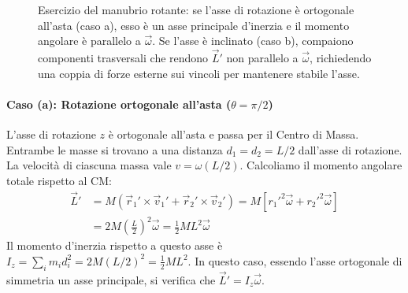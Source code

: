 \begin{figure}[ht]
    \caption{Esercizio del manubrio rotante: se l'asse di rotazione è ortogonale all'asta (caso a), esso è un asse principale d'inerzia e il momento angolare è parallelo a $\vec{\omega}$. Se l'asse è inclinato (caso b), compaiono componenti trasversali che rendono $\vec{L}'$ non parallelo a $\vec{\omega}$, richiedendo una coppia di forze esterne sui vincoli per mantenere stabile l'asse.}
\end{figure}

\paragraph{Caso (a): Rotazione ortogonale all'asta ($\theta = \pi/2$)}
L'asse di rotazione $z$ è ortogonale all'asta e passa per il Centro di Massa. Entrambe le masse si trovano a una distanza $d_1 = d_2 = L/2$ dall'asse di rotazione. La velocità di ciascuna massa vale $v = \omega (L/2)$. Calcoliamo il momento angolare totale rispetto al CM:
\begin{align*}
    \vec{L}' &= M(\vec{r}_1' \times \vec{v}_1' + \vec{r}_2' \times \vec{v}_2') = M \left[ {r_1'}^2 \vec{\omega} + {r_2'}^2 \vec{\omega} \right] \\
    &= 2M \left( \frac{L}{2} \right)^2 \vec{\omega} = \frac{1}{2} M L^2 \vec{\omega}
\end{align*}
Il momento d'inerzia rispetto a questo asse è $I_z = \sum_i m_i d_i^2 = 2M(L/2)^2 = \frac{1}{2}ML^2$. In questo caso, essendo l'asse ortogonale di simmetria un asse principale, si verifica che $\vec{L}' = I_z \vec{\omega}$.

